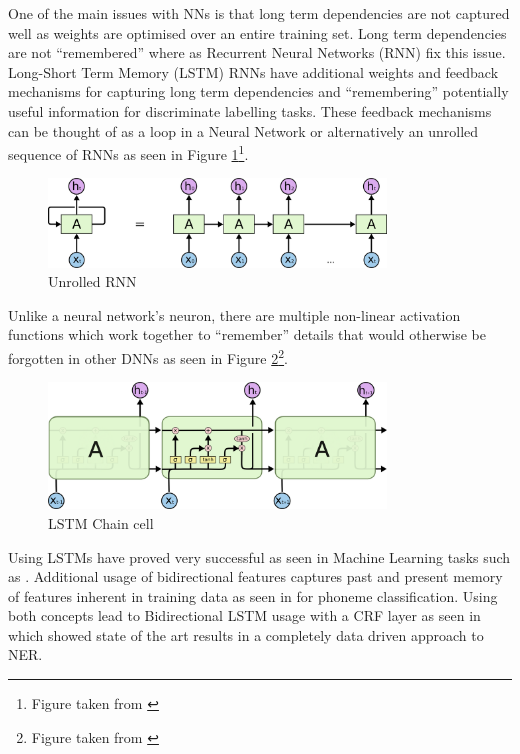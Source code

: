 One of the main issues with NNs is that long term dependencies are not captured well as weights are optimised over an entire training set. Long term dependencies are not ``remembered'' where as Recurrent Neural Networks (RNN) fix this issue. Long-Short Term Memory (LSTM) RNNs have additional weights and feedback mechanisms for capturing long term dependencies and ``remembering'' potentially useful information for discriminate labelling tasks. These feedback mechanisms can be thought of as a loop in a Neural Network or alternatively an unrolled sequence of RNNs as seen in Figure \ref{fig:rnnunrolled}\footnote{Figure taken from \cite{understandinglstmolah}}.

\begin{figure}[H]
\centering
\includegraphics[width=0.8\textwidth]{images/RNN-unrolled.png}
\caption{Unrolled RNN}
\label{fig:rnnunrolled}
\end{figure}

Unlike a neural network's neuron, there are multiple non-linear activation functions which work together to ``remember'' details that would otherwise be forgotten in other DNNs as seen in Figure \ref{fig:lstmcell}\footnote{Figure taken from \cite{understandinglstmolah}}.

\begin{figure}[H]
\centering
\includegraphics[width=0.8\textwidth]{images/LSTM3-chain.png}
\caption{LSTM Chain cell}
\label{fig:lstmcell}
\end{figure}

Using LSTMs have proved very successful as seen in Machine Learning tasks such as \cite{Sutskever2014}. Additional usage of bidirectional features captures past and present memory of features inherent in training data as seen in \cite{Graves2005} for phoneme classification. Using both concepts lead to Bidirectional LSTM usage with a CRF layer as seen in \cite{Lample2016} which showed state of the art results in a completely data driven approach to NER. 

